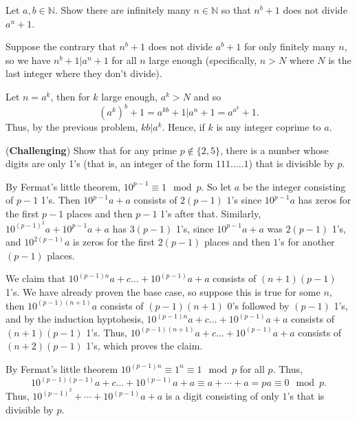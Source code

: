 \documentclass[11pt,dvipsnames]{book}
\numberwithin{equation}{section} %
\numberwithin{figure}{section} %
\numberwithin{table}{section} %
\begin{document}
\begin{exercise}
\begin{exercise}
\end{exercise}


\begin{exercise} Let $a,b\in \mathbb{N}$. Show there are infinitely many $n\in \mathbb{N}$ so that $n^b+1 $ does not divide $a^n+1$. 

\begin{solution}
Suppose the contrary that $n^b+1$ does not divide $a^b+1$ for only finitely many $n$, so we have $n^b+1| a^n+1$ for all $n$ large enough (specifically, $n>N$ where $N$ is the last integer where they don't divide).  

Let $n=a^k$, then for $k$ large enough, $a^k>N$ and so
\[
(a^k)^b +1 =a^{kb}+1| a^n+1=a^{a^{k}}+1.
\]
Thus, by the previous problem, $kb|a^k$. Hence, if $k$ is any integer coprime to $a$.


\end{solution}




\end{exercise}


\begin{exercise} ({\bf Challenging}) Show that for any prime $p\not\in \{2,5\}$, there is a number whose digits are only 1's (that is, an integer of the form $111.....1$) that is divisible by $p$.

\begin{solution}
By Fermat's little theorem, $10^{p-1}\equiv 1 \mod p$. So let $a$ be the integer consisting of $p-1$ 1's. Then $10^{p-1}a+a$ consists of $2(p-1)$ $1$'s since $10^{p-1}a$ has zeros for the first $p-1$ places and then $p-1$ 1's after that. Similarly, $10^{(p-1)^2}a+10^{p-1}a+a$ has $3(p-1)$ 1's, since $10^{p-1}a+a$ was $2(p-1)$ 1's, and $10^{2(p-1)}a$ is zeros for the first $2(p-1)$ places and then $1$'s for another $(p-1)$ places.

We claim that $10^{(p-1)n}a+c\dots + 10^{(p-1)}a+a$ consists of $(n+1)(p-1)$ 1's. We have already proven the base case, so suppose this is true for some $n$, then $10^{(p-1)(n+1)}a$ consists of $(p-1)(n+1)$ 0's followed by $(p-1)$ 1's, and by the induction hyptohesis, $10^{(p-1)n}a+c\dots + 10^{(p-1)}a+a$ consists of $(n+1)(p-1)$ 1's. Thus, $10^{(p-1)(n+1)}a+c\dots + 10^{(p-1)}a+a$ consists of $(n+2)(p-1)$ 1's, which proves the claim. 

By Fermat's little theorem $10^{(p-1)n}\equiv 1^{n} \equiv 1  \mod p$ for all $p$. Thus,
\[
10^{(p-1)(p-1)}a+c\dots + 10^{(p-1)}a+a
\equiv a+\cdots + a = pa\equiv 0 \mod p.
\]
Thus, $10^{(p-1)^2}+\cdots + 10^{(p-1)}a+a$ is a digit consisting of only $1$'s that is divisible by $p$. 



\end{solution}
\end{exercise}
\end{exercise}
\end{document}
